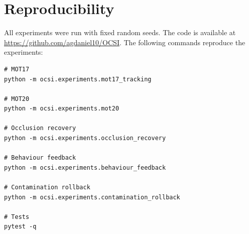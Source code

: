 \documentclass[11pt,a4paper]{article}
\begin{document}
\section{Reproducibility}
All experiments were run with fixed random seeds. The code is available at \url{https://github.com/agdaniel10/OCSI}. The following commands reproduce the experiments:

\begin{verbatim}
# MOT17
python -m ocsi.experiments.mot17_tracking

# MOT20
python -m ocsi.experiments.mot20

# Occlusion recovery
python -m ocsi.experiments.occlusion_recovery

# Behaviour feedback
python -m ocsi.experiments.behaviour_feedback

# Contamination rollback
python -m ocsi.experiments.contamination_rollback

# Tests
pytest -q
\end{verbatim}
\end{document}
